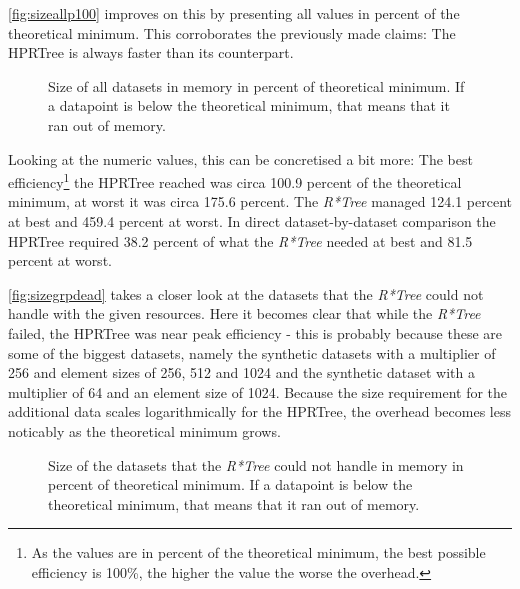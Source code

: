 \autoref{fig:sizeallp100} improves on this by presenting all values in percent of the theoretical minimum. This corroborates the previously made claims: The \acs{HPRTree} is always faster than its counterpart.

\begin{figure}[H]
    \centering
    
    \caption[Size of all datasets in memory in percent of theoretical minimum.]{Size of all datasets in memory in percent of theoretical minimum. If a datapoint is below the theoretical minimum, that means that it ran out of memory.}
    \label{fig:sizeallp100}
\end{figure}

Looking at the numeric values, this can be concretised a bit more: The best efficiency\footnote{As the values are in percent of the theoretical minimum, the best possible efficiency is 100\%, the higher the value the worse the overhead.} the \acs{HPRTree} reached was circa 100.9 percent of the theoretical minimum, at worst it was circa 175.6 percent. The \textit{R*Tree} managed 124.1 percent at best and 459.4 percent at worst. In direct dataset-by-dataset comparison the \acs{HPRTree} required 38.2 percent of what the \textit{R*Tree} needed at best and 81.5 percent at worst.

\autoref{fig:sizegrpdead} takes a closer look at the datasets that the \textit{R*Tree} could not handle with the given resources. Here it becomes clear that while the \textit{R*Tree} failed, the \acs{HPRTree} was near peak efficiency - this is probably because these are some of the biggest datasets, namely the synthetic datasets with a multiplier of 256 and element sizes of 256, 512 and 1024 and the synthetic dataset with a multiplier of 64 and an element size of 1024. Because the size requirement for the additional data scales logarithmically for the \acs{HPRTree}, the overhead becomes less noticably as the theoretical minimum grows.

\begin{figure}[H]
    \centering
    
    \caption[Size of the datasets that the \textit{R*Tree} could not handle in memory in percent of theoretical minimum.]{Size of the datasets that the \textit{R*Tree} could not handle in memory in percent of theoretical minimum. If a datapoint is below the theoretical minimum, that means that it ran out of memory.}
    \label{fig:sizegrpdead}
\end{figure}

